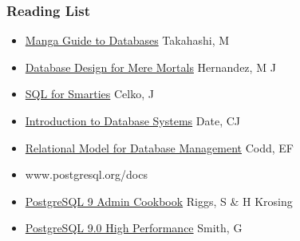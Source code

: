 \documentclass[20pt]{beamer}
\begin{document}
\frame
{
    \frametitle{Reading List}
    \begin{itemize}
    \item[] \underline{Manga Guide to Databases} Takahashi, M
    \item[] \underline{Database Design for Mere Mortals} Hernandez, M J
    \item[] \underline{SQL for Smarties} Celko, J
    \item[] \underline{Introduction to Database Systems} Date, CJ
    \item[] \underline{Relational Model for Database Management} Codd, EF
    \item[] www.postgresql.org/docs
    \item[] \underline{PostgreSQL 9 Admin Cookbook} Riggs, S \& H Krosing
    \item[] \underline{PostgreSQL 9.0 High Performance} Smith, G
    \end{itemize}
}

\end{document}
